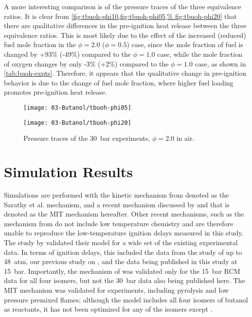\documentclass[../main.tex]{subfiles}
\begin{document}
A more interesting comparison is of the pressure traces of the three
equivalence ratios. It is clear from \cref{fig:tbuoh-phi10,fig:tbuoh-phi05,%
fig:tbuoh-phi20} that there are qualitative differences in the pre-ignition
heat release between the three equivalence ratios. This is most likely
due to the effect of the increased (reduced) fuel mole fraction in the
$\phi=\num{2.0}$ ($\phi=\num{0.5}$) case, since the mole fraction of
fuel is changed by +93\% (-49\%) compared to the $\phi=\num{1.0}$ case, while the
mole fraction of oxygen changes by only -3\% (+2\%) compared to the $\phi=\num{1.0}$
case, as shown in \cref{tab:buoh-expts}. Therefore, it appears that the
qualitative change in pre-ignition behavior is due to the change of fuel mole
fraction, where higher fuel loading promotes pre-ignition heat release.

\begin{figure}
    \begin{floatrow}
    \ffigbox
        {\texttt{[image: 03-Butanol/tbuoh-phi05]}}
        {\caption{Pressure traces of the \SI{30}{\bar} \tBuOH{} experiments,
            $\phi=\num{0.5}$ in air.}
        \label{fig:tbuoh-phi05}}
    \ffigbox
        {\texttt{[image: 03-Butanol/tbuoh-phi20]}}
        {\caption{Pressure traces of the \SI{30}{\bar} \tBuOH{} experiments,
            $\phi=\num{2.0}$ in air.}
        \label{fig:tbuoh-phi20}}
    \end{floatrow}
\end{figure}

\section{Simulation Results}
\label{sec:buoh-sims}

Simulations are performed with the kinetic mechanism from
\textcite{Sarathy2012} denoted as the Sarathy et al. mechanism, and a
recent mechanism discussed by \textcite{Hansen2013} and
\textcite{Merchant2013} that is denoted as the MIT mechanism hereafter.
Other recent mechanisms, such as the mechanism from
\textcite{Frassoldati2012} do not include low temperature chemistry and are
therefore unable to reproduce the low-temperature ignition delays measured in
this study. The study by \textcite{Sarathy2012} validated their model for a
wide set of the existing experimental data. In terms of ignition delays, this
included the data from the study of \textcite{Stranic2012} up to \SI{48}{atm}, our
previous study on \nBuOH{} \cite{Weber2011}, and the data being
published in this study at \SI{15}{\bar}. Importantly, the mechanism of
\textcite{Sarathy2012} was validated only for the \SI{15}{\bar} RCM data for all four
isomers, but not the \SI{30}{\bar} data also being published here. The MIT mechanism
\cite{Hansen2013,Merchant2013} was validated for \iBuOH{}
experiments, including pyrolysis and low pressure premixed flames; although the
model includes all four isomers of butanol as reactants, it has not been
optimized for any of the isomers except \iBuOH{}.
\end{document}
